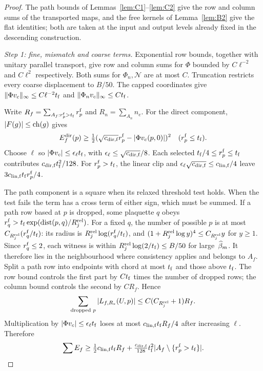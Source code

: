 \begin{proof}
The path bounds of Lemmas~\ref{lem:C1}--\ref{lem:C2} give the row and column sums of the transported maps, and the free kernels of Lemma~\ref{lem:B2} give the flat identities; both are taken at the input and output levels already fixed in the descending construction.

\emph{Step 1: fine, mismatch and coarse terms.} Exponential row bounds, together with unitary parallel transport, give row and column sums for $\Phi$ bounded by $C\ell^{-2}$ and $C\ell^2$ respectively. Both sums for $\Phi_n,\mathcal N$ are at most $C$. Truncation restricts every coarse displacement to $B/50$. The capped coordinates give $\|\Phi v_c\|_\infty\le C\ell^{-2}t_{\rm f}$ and $\|\Phi_nv_c\|_\infty\le Ct_{\rm f}$.

Write $R_f=\sum_{A_f:r^{\rm f}_p>t_{\rm f}}r^{\rm f}_p$ and $R_n=\sum_{A_n}n_e$. For the direct component, $|F(g)|\le\operatorname{ch}(g)$ gives
\begin{equation*}
E_f^{\rm dir}(p)\ge\tfrac12(\sqrt{c_{{\rm dir},{\rm f}}}r^{\rm f}_p-|\Phi v_c(p,0)|)^2\quad(r^{\rm f}_p\le t_{\rm f}).
\end{equation*}
Choose $\ell$ so $|\Phi v_c|\le\epsilon_\ell t_{\rm f}$, with $\epsilon_\ell\le\sqrt{c_{{\rm dir},{\rm f}}}/8$. Each selected $t_{\rm f}/4\le r^{\rm f}_p\le t_{\rm f}$ contributes $c_{{\rm dir},{\rm f}}t_{\rm f}^2/128$. For $r^{\rm f}_p>t_{\rm f}$, the linear clip and $\epsilon_\ell\sqrt{c_{{\rm dir},{\rm f}}}\le c_{{\rm lin},{\rm f}}/4$ leave $3c_{{\rm lin},{\rm f}}t_{\rm f}r^{\rm f}_p/4$.

The path component is a square when its relaxed threshold test holds. When the test fails the term has a cross term of either sign, which must be summed. If a path row based at $p$ is dropped, some plaquette $q$ obeys $r^{\rm f}_q>t_{\rm f}\exp(\operatorname{dist}(p,q)/R_j^{\rm rel})$. For a fixed $q$, the number of possible $p$ is at most $C_{R_j^{\rm rel}}(r^{\rm f}_q/t_{\rm f})$: its radius is $R_j^{\rm rel}\log(r^{\rm f}_q/t_{\rm f})$, and $(1+R_j^{\rm rel}\log y)^4\le C_{R_j^{\rm rel}}y$ for $y\ge1$. Since $r^{\rm f}_q\le2$, each witness is within $R_j^{\rm rel}\log(2/t_{\rm f})\le B/50$ for large~$\widehat{\beta}_m$. It therefore lies in the neighbourhood where consistency applies and belongs to $A_f$. Split a path row into endpoints with chord at most $t_{\rm f}$ and those above $t_{\rm f}$. The row bound controls the first part by $Ct_{\rm f}$ times the number of dropped rows; the column bound controls the second by $CR_f$. Hence
\begin{equation*}
\sum_{\text{dropped }p}|L_{f,R_*}(U,p)|\le C(C_{R_j^{\rm rel}}+1)R_f.
\end{equation*}
Multiplication by $|\Phi v_c|\le\epsilon_\ell t_{\rm f}$ loses at most $c_{{\rm lin},{\rm f}}t_{\rm f}R_f/4$ after increasing $\ell$. Therefore
\begin{equation*}
\sum E_f\ge\tfrac12c_{{\rm lin},{\rm f}}t_{\rm f}R_f+\tfrac{c_{{\rm dir},{\rm f}}}{128} t_{\rm f}^2|A_f\setminus\{r^{\rm f}_p>t_{\rm f}\}|.
\end{equation*}


\end{proof}
